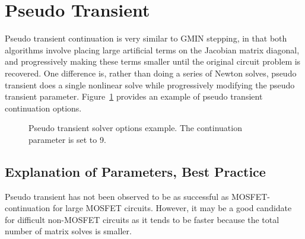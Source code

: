 \newpage 
\section{Pseudo Transient}
\label{continuation_pseudotran}

Pseudo transient continuation is very similar to GMIN stepping, in
that both algorithms involve placing large artificial terms on the
Jacobian matrix diagonal, and progressively making these terms smaller
until the original circuit problem is recovered.  One difference is,
rather than doing a series of Newton solves, pseudo transient does a
single nonlinear solve while progressively modifying the pseudo
transient parameter. Figure~\ref{pseudo_netlist_frag} provides an
example of pseudo transient continuation options.

\begin{figure}[htbp]
\begin{centering}
\caption [Pseudo transient solver options example.]{Pseudo transient solver options example. The continuation parameter is set to 9. \label{pseudo_netlist_frag}} 
\end{centering}
\end{figure}

\subsection{Explanation of Parameters, Best Practice}

Pseudo transient has not been observed to be as successful as
MOSFET-continuation for large MOSFET circuits. However, it may be a good
candidate for difficult non-MOSFET circuits as it tends to be faster
because the total number of matrix solves is smaller.

